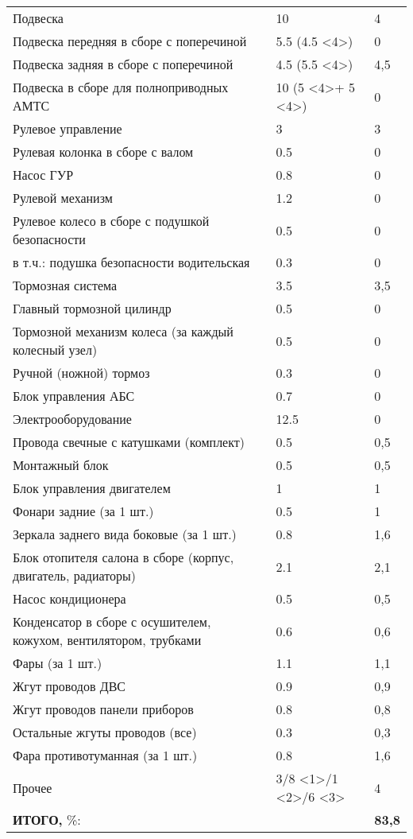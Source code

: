 \begin{longtable}{|p{9cm}|p{4cm}|p{2cm}|}
 		Подвеска & 10 & 4 \\
 		Подвеска передняя в сборе с поперечиной & 5.5 (4.5 \textless{}4\textgreater{}) & 0 \\
 		Подвеска задняя в сборе с поперечиной & 4.5 (5.5 \textless{}4\textgreater{}) & 4,5 \\
 		Подвеска в сборе для полноприводных АМТС & 10 (5 \textless{}4\textgreater + 5 \textless{}4\textgreater{}) & 0 \\
 		Рулевое управление & 3 & 3 \\
 		Рулевая колонка в сборе с валом & 0.5 & 0 \\
 		Насос ГУР & 0.8 & 0 \\
 		Рулевой механизм & 1.2 & 0 \\
 		Рулевое колесо в сборе с подушкой безопасности & 0.5 & 0 \\
 		в т.ч.: подушка безопасности  водительская & 0.3 & 0 \\
 		Тормозная система & 3.5 & 3,5 \\
 		Главный тормозной цилиндр & 0.5 & 0 \\
 		Тормозной механизм колеса (за каждый колесный узел) & 0.5 & 0 \\
 		Ручной (ножной) тормоз & 0.3 & 0 \\
 		Блок управления АБС & 0.7 & 0 \\
 		Электрооборудование & 12.5 & 0 \\
 		Провода свечные с катушками (комплект) & 0.5 & 0,5 \\
 		Монтажный блок & 0.5 & 0,5 \\
 		Блок управления двигателем & 1 & 1 \\
 		Фонари задние (за 1 шт.) & 0.5 & 1 \\
 		Зеркала заднего вида боковые (за 1 шт.) & 0.8 & 1,6 \\
 		Блок отопителя салона в сборе (корпус, двигатель, радиаторы) & 2.1 & 2,1 \\
 		Насос кондиционера & 0.5 & 0,5 \\
 		Конденсатор в сборе с осушителем, кожухом, вентилятором, трубками & 0.6 & 0,6 \\
 		Фары (за 1 шт.) & 1.1 & 1,1 \\
 		Жгут проводов ДВС & 0.9 & 0,9 \\
 		Жгут проводов панели приборов & 0.8 & 0,8 \\
 		Остальные жгуты проводов (все) & 0.3 & 0,3 \\
 		Фара противотуманная (за 1 шт.) & 0.8 & 1,6 \\ 
 		Прочее & 3/8 \textless{}1\textgreater{}/1 \textless{}2\textgreater /6 \textless{}3\textgreater{} & 4 \\
 		\hline
 		\textbf{ИТОГО,} \%: &  & \textbf{83,8}  \\
 		\hline	
 	\end{longtable}
 
